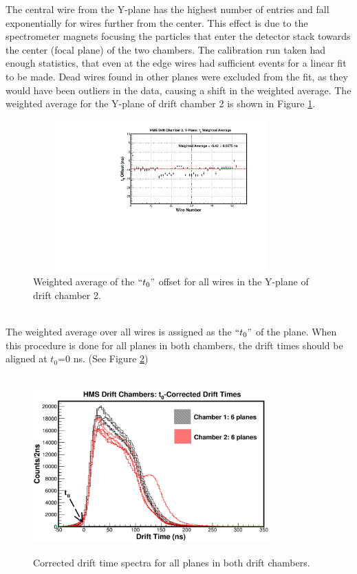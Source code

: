 \documentclass[journal, a4paper]{IEEEtran}
\begin{document}
The central wire from the Y-plane has the highest number of entries and fall exponentially for wires further from the
center. This effect is due to the spectrometer magnets focusing the particles that enter the detector stack towards
the center (focal plane) of the two chambers.
The calibration run taken had enough statistics, that even at the edge wires had sufficient events for a linear
fit to be made. Dead wires found in other planes were excluded from the fit, as they would have been outliers in
the data, causing a shift in the weighted average. The weighted average for the Y-plane of drift chamber 2 is shown
in Figure \ref{fig:hdc2y1_wght_avg}.
\begin{figure}[!ht]
  \centering
  \includegraphics[width=3.8in, height=2.3in]{hdc2y1_wght_avg.pdf}
  \caption{Weighted average of the $``t_{0}"$ offset for all wires in the Y-plane of drift chamber 2.}
  \label{fig:hdc2y1_wght_avg}
\end{figure}\\
The weighted average over all wires is assigned as the $``t_{0}"$ of the plane. When this procedure is done for all planes
in both chambers, the drift times should be aligned at $t_{0}$=0 ns. (See Figure \ref{fig:t0_corr})
\begin{figure}[!ht]
  \centering
  \includegraphics[width=3.6in, height=2.7in]{t0_corr_times.pdf}
  \caption{Corrected drift time spectra for all planes in both drift chambers.}
  \label{fig:t0_corr}
\end{figure}\\
\end{document}
